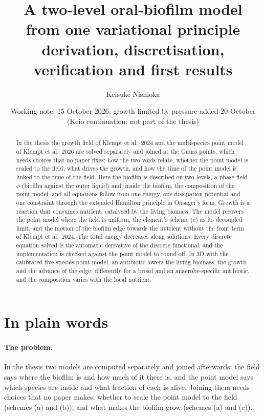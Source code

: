 \documentclass[11pt,a4paper]{article}
\title{\bfseries A two-level oral-biofilm model from one variational principle\\[2pt]
\large derivation, discretisation, verification and first results}
\author{Keisuke Nishioka}
\date{Working note, 15 October 2026, growth limited by pressure added 20 October (Keio continuation; not part of the thesis)}
\begin{document}
\maketitle

\begin{abstract}
\noindent In the thesis the growth field of Klempt et al.\ 2024 and the multispecies point
model of Klempt et al.\ 2026 are solved separately and joined at the Gauss points, which needs
choices that no paper fixes: how the two voids relate, whether the point model is scaled to the
field, what drives the growth, and how the time of the point model is linked to the time of the field. Here the biofilm is described
on two levels, a phase field $\phi$ (biofilm against the outer liquid) and, inside the biofilm,
the composition of the point model, and all equations follow from one energy, one dissipation
potential and one constraint through the extended Hamilton principle in Onsager's form. Growth
is a reaction that consumes nutrient, catalysed by the living biomass. The model recovers the
point model where the field is uniform, the element's scheme (c) as its decoupled limit, and
the motion of the biofilm edge towards the nutrient without the front term of Klempt et al.\
2024. The total energy decreases along solutions. Every discrete equation solved is the
automatic derivative of the discrete functional, and the implementation is checked against the
point model to round-off. In 3D with the calibrated five-species point model, an antibiotic
lowers the living biomass, the growth and the advance of the edge, differently for a broad and
an anaerobe-specific antibiotic, and the composition varies with the local nutrient.
\end{abstract}

\section*{In plain words}

\paragraph{The problem.} In the thesis two models are computed separately and joined
afterwards: the field says where the biofilm is and how much of it there is, and the point
model says which species are inside and what fraction of each is alive. Joining them needs
choices that no paper makes: whether to scale the point model to the field (schemes (a) and
(b)), and what makes the biofilm grow (schemes (a) and (c)).
\end{document}
